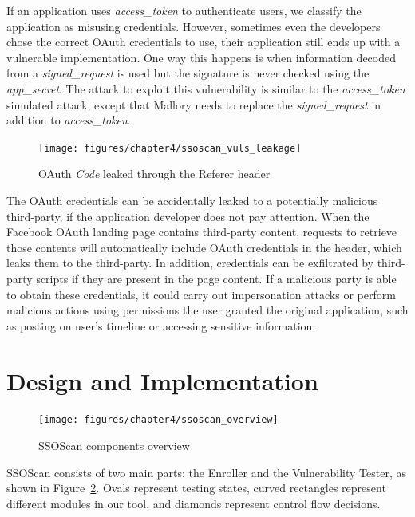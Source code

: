   If an application uses \emph{access\_token} to authenticate users, we classify the application as misusing credentials.  However, sometimes even the developers chose the correct OAuth credentials to use, their application still ends up with a vulnerable implementation.  One way this happens is when information decoded from a \emph{signed\_request} is used but the signature is never checked using the \emph{app\_secret}.  The attack to exploit this vulnerability is similar to the \emph{access\_token} simulated attack, except that Mallory needs to replace the \emph{signed\_request} in addition to \emph{access\_token}.

\begin{figure}[hbt]
\centering
\texttt{[image: figures/chapter4/ssoscan\_vuls\_leakage]}
\caption{OAuth \emph{Code} leaked through the Referer header}
\label{fig:ssoscan_vuls_leakage}
\end{figure}

  The OAuth credentials can be accidentally leaked to a potentially malicious third-party, if the application developer does not pay attention.  When the Facebook OAuth landing page contains third-party content, requests to retrieve those contents will automatically include OAuth credentials in the  header, which leaks them to the third-party.  In addition, credentials can be exfiltrated by third-party scripts if they are present in the page content.  If a malicious party is able to obtain these credentials, it could carry out impersonation attacks or perform malicious actions using permissions the user granted the original application, such as posting on user's timeline or accessing sensitive information.

\section{Design and Implementation}
\label{sec:ssoscan_design}

\begin{figure}[hbt]
\centering
\texttt{[image: figures/chapter4/ssoscan\_overview]}
\caption{SSOScan components overview}
\label{fig:ssoscan_overview}
\end{figure}

SSOScan consists of two main parts: the Enroller and the Vulnerability Tester, as shown in Figure~\ref{fig:ssoscan_overview}.  Ovals represent testing states, curved rectangles represent different modules in our tool, and diamonds represent control flow decisions.  

